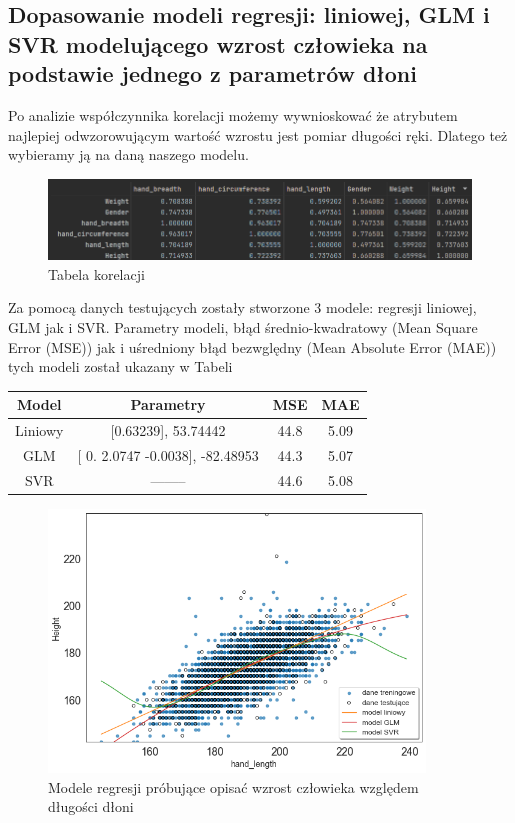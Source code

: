 \documentclass{article}
\begin{document}
\subsection{Dopasowanie modeli regresji: liniowej, GLM i SVR modelującego wzrost człowieka na podstawie jednego z parametrów dłoni}
Po analizie współczynnika korelacji możemy wywnioskować że atrybutem najlepiej odwzorowującym wartość wzrostu jest pomiar długości ręki. Dlatego też wybieramy ją na daną naszego modelu.
\begin{figure}[H]
    \centering
    \includegraphics[width=12cm]{Height_corr.png}
    \caption{Tabela korelacji}
    \label{fig:my_img}
\end{figure}
Za pomocą danych testujących zostały stworzone 3 modele: regresji liniowej, GLM jak i SVR. Parametry modeli, błąd średnio-kwadratowy (Mean Square Error (MSE)) jak i uśredniony błąd bezwględny (Mean Absolute Error (MAE)) tych modeli został ukazany w Tabeli
\begin{center}
\begin{tabular}{ |c|c|c|c| } 
 \hline
 Model & Parametry & MSE & MAE  \\ 
 \hline
 \hline
 Liniowy & [0.63239], 53.74442 & 44.8 & 5.09 \\ 
 \hline
 GLM & [ 0.      2.0747 -0.0038], -82.48953 & 44.3 & 5.07 \\
 \hline
 SVR  & ——– & 44.6 & 5.08   \\
 \hline
\end{tabular}
\end{center}
\begin{figure}[H]
    \centering
    \includegraphics[width=10cm]{modelregresjiwysokosc.png}
    \caption{Modele regresji próbujące opisać wzrost człowieka względem długości dłoni}
    \label{fig:my_img}
\end{figure}
\end{document}
